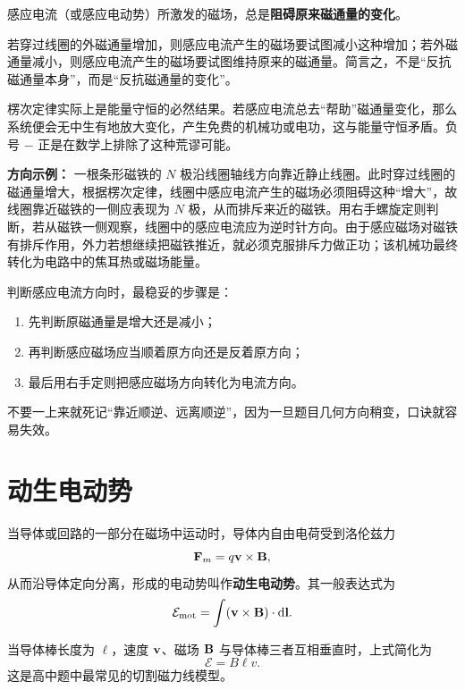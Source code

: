 \begin{law}[楞次定律]
感应电流（或感应电动势）所激发的磁场，总是\textbf{阻碍原来磁通量的变化}。
\end{law}

若穿过线圈的外磁通量增加，则感应电流产生的磁场要试图减小这种增加；若外磁通量减小，则感应电流产生的磁场要试图维持原来的磁通量。简言之，不是“反抗磁通量本身”，而是“反抗磁通量的变化”。

楞次定律实际上是能量守恒的必然结果。若感应电流总去“帮助”磁通量变化，那么系统便会无中生有地放大变化，产生免费的机械功或电功，这与能量守恒矛盾。负号 $-$ 正是在数学上排除了这种荒谬可能。

\begin{remark}
\textbf{方向示例：} 一根条形磁铁的 $N$ 极沿线圈轴线方向靠近静止线圈。此时穿过线圈的磁通量增大，根据楞次定律，线圈中感应电流产生的磁场必须阻碍这种“增大”，故线圈靠近磁铁的一侧应表现为 $N$ 极，从而排斥来近的磁铁。用右手螺旋定则判断，若从磁铁一侧观察，线圈中的感应电流应为逆时针方向。由于感应磁场对磁铁有排斥作用，外力若想继续把磁铁推近，就必须克服排斥力做正功；该机械功最终转化为电路中的焦耳热或磁场能量。
\end{remark}

\begin{remark}
判断感应电流方向时，最稳妥的步骤是：
\begin{enumerate}
  \item 先判断原磁通量是增大还是减小；
  \item 再判断感应磁场应当顺着原方向还是反着原方向；
  \item 最后用右手定则把感应磁场方向转化为电流方向。
\end{enumerate}
不要一上来就死记“靠近顺逆、远离顺逆”，因为一旦题目几何方向稍变，口诀就容易失效。
\end{remark}

\section{动生电动势}

\begin{definition}
当导体或回路的一部分在磁场中运动时，导体内自由电荷受到洛伦兹力
\[
\vb{F}_m=q\vb{v}\times\vb{B},
\]
从而沿导体定向分离，形成的电动势叫作\textbf{动生电动势}。其一般表达式为
\[
\mathcal{E}_{\text{mot}}=\int (\vb{v}\times\vb{B})\cdot \dd \vb{l}.
\]
\end{definition}

当导体棒长度为 $\ell$，速度 $\vb{v}$、磁场 $\vb{B}$ 与导体棒三者互相垂直时，上式简化为
\[
\mathcal{E}=B\ell v.
\]
这是高中题中最常见的切割磁力线模型。

